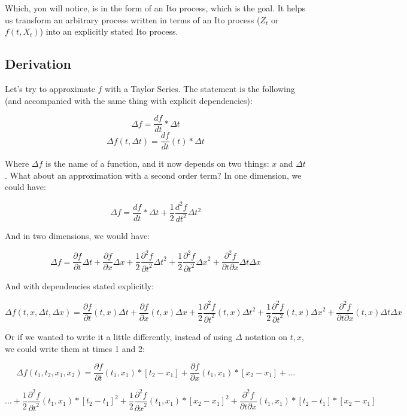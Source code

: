 \documentclass{article}
\begin{document}
Which, you will notice, is in the form of an Ito process, which is the goal.  It helps us transform an arbitrary process written in terms of an Ito process ($Z_t$ or $f(t,X_t)$) into an explicitly stated Ito process.

\subsection{Derivation}

Let's try to approximate $f$ with a Taylor Series.  The statement is the following (and accompanied with the same thing with explicit dependencies):

$$\Delta f = \frac{df}{dt} * \Delta t$$
$$\Delta f(t, \Delta t) = \frac{df}{dt}(t) * \Delta t$$

Where $\Delta f$ is the name of a function, and it now depends on two things: $x$ and $\Delta t$.  What about an approximation with a second order term?  In one dimension, we could have:

$$\Delta f = \frac{df}{dt} * \Delta t + \frac{1}{2} \frac{d^2f}{dt^2} \Delta t ^2$$

And in two dimensions, we would have: 

$$\Delta f = \frac{\partial f}{\partial t} \Delta t + \frac{\partial f}{\partial x} \Delta x + \frac{1}{2}\frac{\partial^2 f}{{\partial t}^2} {\Delta t}^2 + \frac{1}{2}\frac{\partial^2 f}{{\partial t}^2} {\Delta x}^2 +  \frac{\partial^2 f}{\partial t \partial x} \Delta t\Delta x$$

And with dependencies stated explicitly:

$$\Delta f(t,x,\Delta t,\Delta x) = \frac{\partial f}{\partial t}(t,x) \Delta t + \frac{\partial f}{\partial x}(t,x) \Delta x  + \frac{1}{2}\frac{\partial^2 f}{{\partial t}^2}(t,x) {\Delta t}^2 + \frac{1}{2}\frac{\partial^2 f}{{\partial t}^2}(t,x) {\Delta x}^2 +  \frac{\partial^2 f}{\partial t \partial x}(t,x) \Delta t\Delta x$$

Or if we wanted to write it a little differently, instead of using $\Delta$ notation on $t, x$, we could write them at times 1 and 2:

$$\Delta f(t_1,t_2,x_1,x_2) = \frac{\partial f}{\partial t}(t_1,x_1) *[t_2-x_1] + \frac{\partial f}{\partial x}(t_1,x_1) *[x_2-x_1]  + ... $$

$$... +  \frac{1}{2}\frac{\partial^2 f}{{\partial t}^2}(t_1,x_1) * {[t_2-t_1]}^2 + \frac{1}{2}\frac{\partial^2 f}{{\partial x}^2}(t_1,x_1) * {[x_2-x_1]}^2 +  \frac{\partial^2 f}{\partial t \partial x}(t_1,x_1) *[t_2-t_1]*[x_2-x_1]$$
\end{document}
